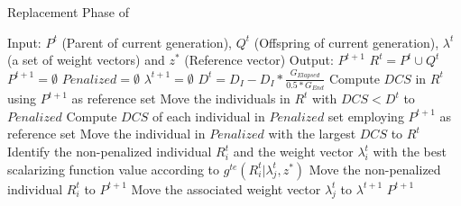 \begin{algorithm}[t]
        \caption{Replacement Phase of \AVSDMOEAD{}}
\begin{small}
\begin{algorithmic}[1]
\STATE Input: $P^t$ (Parent of current generation), $Q^t$ (Offspring of current generation), $\lambda^t$ (a set of weight vectors) and $z^*$ (Reference vector)
        \STATE Output: $P^{t+1}$
        \STATE $R^t = P^t \cup Q^t$\label{alg_2:1} 
        \STATE $P^{t+1} = \emptyset$ \label{alg_2:2}
        \STATE $Penalized = \emptyset$ \label{alg_2:3}
	\STATE $\lambda^{t+1} = \emptyset$ \label{alg_2:4}
        \STATE $D^t = D_I - D_I * \frac{G_{Elapsed}}{0.5*G_{End}}$ \label{alg_2:5} 
         \label{alg_2:6}
            \STATE Compute $DCS$ in $R^t$ using $P^{t+1}$ as reference set \label{alg_2:7}
            \STATE Move the individuals in $R^t$ with $DCS < D^t$ to $Penalized$ \label{alg_2:8}
                 \label{alg_2:9}
                    \STATE Compute $DCS$ of each individual in $Penalized$ set employing $P^{t+1}$ as reference set \label{alg_2:10}
                    \STATE Move the individual in $Penalized$ with the largest $DCS$ to $R^t$ \label{alg_2:11}
                \ENDIF \label{alg_2:12}
            \STATE Identify the non-penalized individual $R_i^t$ and the weight vector $\lambda_i^t$ with the best scalarizing function value according to $g^{te}(R_i^t | \lambda_j^t, z^*)$ \label{alg_2:13}
	    \STATE Move the non-penalized individual $R_i^t$ to $P^{t+1}$ \label{alg_2:14}
            \STATE Move the associated weight vector $\lambda^t_j$ to $\lambda^{t+1}$ \label{alg_2:15}
        \ENDWHILE \label{alg_2:16}
        \RETURN $P^{t+1}$ \label{alg_2:17}
        \end{algorithmic}
\end{small}
\label{alg:replacement}
\end{algorithm}

